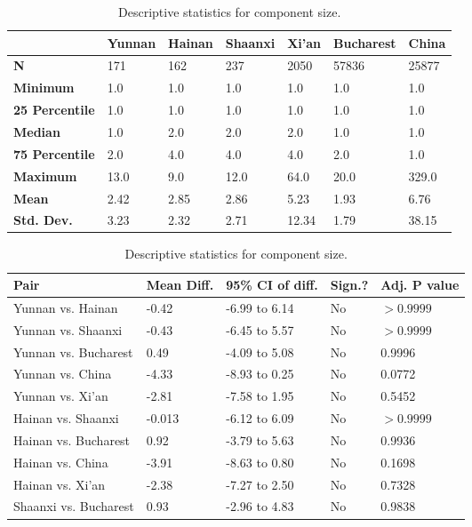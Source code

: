 \begin{table}[htbp]
	\begin{mdframed}
		\begin{tabular*}{\linewidth}{l|llllll}
			\hline
			\textbf{ } & \textbf{Yunnan} & \textbf{Hainan} & \textbf{Shaanxi} & \textbf{Xi'an} & \textbf{Bucharest} & \textbf{China}\\
			\hline
			\textbf{N} & 171 & 162 & 237 & 2050 & 57836 & 25877\\
			\textbf{Minimum} & 1.0 & 1.0 & 1.0 & 1.0 & 1.0 & 1.0\\
			\textbf{25 Percentile} & 1.0 & 1.0 & 1.0 & 1.0 & 1.0 & 1.0\\
			\textbf{Median} & 1.0 & 2.0 & 2.0 & 2.0 & 1.0 & 1.0\\
			\textbf{75 Percentile} & 2.0 & 4.0 & 4.0 & 4.0 & 2.0 & 1.0\\
			\textbf{Maximum} & 13.0 & 9.0 & 12.0 & 64.0 & 20.0 & 329.0\\
			\textbf{Mean} & 2.42 & 2.85 & 2.86 & 5.23 & 1.93 & 6.76\\
			\textbf{Std. Dev.} & 3.23 & 2.32 & 2.71 & 12.34 & 1.79 & 38.15\\
			\hline
		\end{tabular*}
		\caption{Descriptive statistics for component size.}
		\label{tab:component_size_desc}
		\vskip 10pt
		\small
		\begin{tabular*}{\linewidth}{l|llll}
			\hline
			\textbf{Pair} & \textbf{Mean Diff.} & \textbf{95\% CI of diff.} & \textbf{Sign.?} & \textbf{Adj. P value}\\
			\hline
			Yunnan vs. Hainan & -0.42 & -6.99 to 6.14 & No & $>0.9999$\\
			Yunnan vs. Shaanxi & -0.43 & -6.45 to 5.57 & No & $>0.9999$\\
			Yunnan vs. Bucharest & 0.49 & -4.09 to 5.08 & No & 0.9996\\
			Yunnan vs. China & -4.33 & -8.93 to 0.25 & No & 0.0772\\
			Yunnan vs. Xi'an & -2.81 & -7.58 to 1.95 & No & 0.5452\\
			Hainan vs. Shaanxi & -0.013 & -6.12 to 6.09 & No & $>0.9999$\\
			Hainan vs. Bucharest & 0.92 & -3.79 to 5.63 & No & 0.9936\\
			Hainan vs. China & -3.91 & -8.63 to 0.80 & No & 0.1698\\
			Hainan vs. Xi'an & -2.38 & -7.27 to 2.50 & No & 0.7328\\
			Shaanxi vs. Bucharest & 0.93 & -2.96 to 4.83 & No & 0.9838\\

\end{tabular*}
\end{mdframed}
\end{table}
